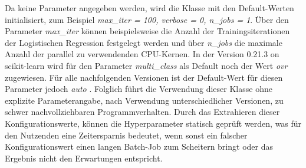 \documentclass[german,bachelor]{swsLeipzig}
\begin{document}
Da keine Parameter angegeben werden, wird die Klasse mit den Default-Werten initialisiert, zum Beispiel
\textit{max\_iter = 100, verbose = 0, n\_jobs = 1}.
Über den Parameter \textit{max\_iter} können beispielsweise die Anzahl der Trainingsiterationen
der Logistischen Regression festgelegt werden und über \textit{n\_jobs} die maximale Anzahl der parallel zu verwendenden CPU-Kernen.
In der Version 0.21.3 on scikit-learn wird für den Parameter \textit{multi\_class} als Default noch der Wert \textit{ovr} zugewiesen.
Für alle nachfolgenden Versionen ist der Default-Wert für diesen Parameter jedoch \textit{auto} \cite[]{sklearn}.
Folglich führt die Verwendung dieser Klasse ohne explizite Parameterangabe, nach Verwendung unterschiedlicher Versionen, zu schwer nachvollziehbaren Programmverhalten.
\indent Durch das Extrahieren dieser Konfigurationswerte, können die Hyperparameter statisch geprüft werden, was für den Nutzenden
eine Zeitersparnis bedeutet, wenn sonst ein falscher Konfigurationswert einen langen Batch-Job zum Scheitern bringt
oder das Ergebnis nicht den Erwartungen entspricht. \\
\end{document}
